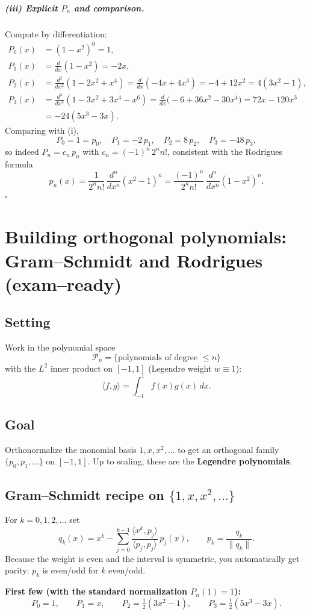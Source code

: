 \documentclass[12pt,a4paper]{article}
\newcommand{\qed}{\hfill$\square$}
\theoremstyle{plain}
\theoremstyle{definition}
\theoremstyle{remark}
\theoremstyle{remark}
\begin{document}
\subparagraph*{(iii) Explicit $P_n$ and comparison.}
Compute by differentiation:
\[
\begin{aligned}
	P_0(x)&=(1-x^2)^{0}=1,\\
	P_1(x)&=\frac{d}{dx}(1-x^2)=-2x,\\
	P_2(x)&=\frac{d^2}{dx^2}(1-2x^2+x^4)=\frac{d}{dx}(-4x+4x^3)=-4+12x^2=4(3x^2-1),\\
	P_3(x)&=\frac{d^3}{dx^3}(1-3x^2+3x^4-x^6)=\frac{d}{dx}\big(-6+36x^2-30x^4\big)=72x-120x^3\\
	&=-24(5x^3-3x).
\end{aligned}
\]
Comparing with (i),
\[
P_0=1=p_0,\quad
P_1=-2\,p_1,\quad
P_2=8\,p_2,\quad
P_3=-48\,p_3,
\]
so indeed $P_n=c_n\,p_n$ with $c_n=(-1)^n\,2^n n!$, consistent with the Rodrigues formula
\[
p_n(x)=\frac{1}{2^n n!}\,\frac{d^n}{dx^n}(x^2-1)^n
=\frac{(-1)^n}{2^n n!}\,\frac{d^n}{dx^n}(1-x^2)^n.
\]
\qed


\section*{Building orthogonal polynomials: Gram–Schmidt and Rodrigues (exam–ready)}

\subsection*{Setting}
Work in the polynomial space
\[
\mathcal P_n=\{ \text{polynomials of degree }\le n\}
\]
with the $L^2$ inner product on $[-1,1]$ (Legendre weight $w\equiv1$):
\[
\langle f,g\rangle=\int_{-1}^{1} f(x)g(x)\,dx .
\]

\subsection*{Goal}
Orthonormalize the monomial basis $1,x,x^2,\dots$ to get an orthogonal family
$\{p_0,p_1,\dots\}$ on $[-1,1]$. Up to scaling, these are the \textbf{Legendre polynomials}.

\subsection*{Gram–Schmidt recipe on $\{1,x,x^2,\dots\}$}
For $k=0,1,2,\dots$ set
\[
q_k(x)=x^k-\sum_{j=0}^{k-1}\frac{\langle x^k,p_j\rangle}{\langle p_j,p_j\rangle}\,p_j(x),
\qquad
p_k=\frac{q_k}{\|q_k\|}.
\]
Because the weight is even and the interval is symmetric, you automatically get parity:
$p_k$ is even/odd for $k$ even/odd.

\smallskip
\noindent\textbf{First few (with the standard normalization $P_n(1)=1$):}
\[
P_0=1,\qquad
P_1=x,\qquad
P_2=\tfrac12(3x^2-1),\qquad
P_3=\tfrac12(5x^3-3x).
\]
\end{document}
